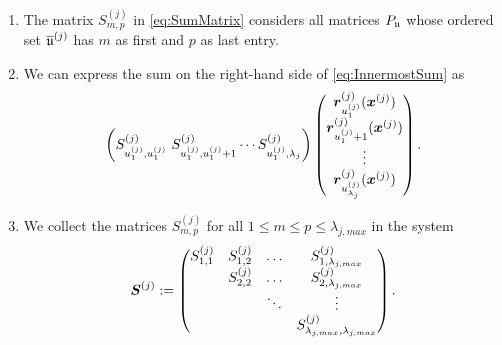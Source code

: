 \documentclass[	a4paper, 
								11pt]{article}
\theoremstyle{plain}
\begin{document}
\begin{remark}
\begin{enumerate}
    \item The matrix $ S^{(j)}_{m,p} $ in \eqref{eq:SumMatrix} considers all matrices $ P_{\mathfrak{u}} $ whose ordered set $\overline{\mathfrak{u}}^{(j)}$ has $ m $ as first and $ p $ as last entry.
    \item We can express the sum on the right-hand side of \eqref{eq:InnermostSum} as
    \begin{align*}
        \left(S^{(j)}_{u^{(j)}_1,u^{(j)}_1} \ S^{(j)}_{u^{(j)}_1, u^{(j)}_1 + 1} \cdots S^{(j)}_{u^{(j)}_1, \lambda_j} \right) \begin{pmatrix} \boldsymbol{r}^{(j)}_{u^{(j)}_1}(\boldsymbol{x}^{(j)}) \\ \boldsymbol{r}^{(j)}_{u^{(j)}_1 + 1}(\boldsymbol{x}^{(j)}) \\ \vdots \\ \boldsymbol{r}^{(j)}_{u^{(j)}_{\lambda_j}}(\boldsymbol{x}^{(j)})
         \end{pmatrix}.
    \end{align*}
    \item We collect the matrices $ S^{(j)}_{m,p} $ for all $ 1 \leq m \leq p \leq \lambda_{j,max} $ in the system
    \begin{align}\label{eq:LargeSMatrix}
        \boldsymbol{S}^{(j)} :=
        \begin{pmatrix} 
        S^{(j)}_{1,1} & S^{(j)}_{1,2} & \hdots & S^{(j)}_{1, \lambda_{j,max}} \\ 
                      & S^{(j)}_{2,2} & \hdots & S^{(j)}_{2,\lambda_{j,max}}  \\
                      &               & \ddots & \vdots                       \\
                      &               &        & S^{(j)}_{\lambda_{j,max},\lambda_{j,max}}
        \end{pmatrix}.                  
    \end{align}
\end{enumerate}
\end{remark}
\end{document}
